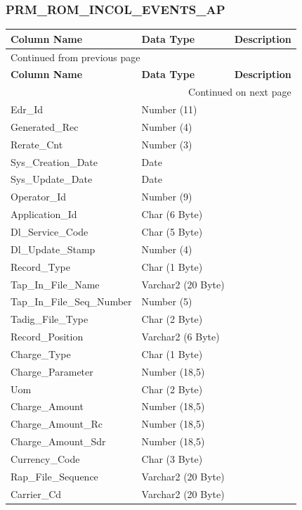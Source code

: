 \documentclass[12pt,twoside]{article}
\begin{document}
\subsubsection{PRM\_ROM\_INCOL\_EVENTS\_AP}
\label{sec:orgheadline84}
\footnotesize
\begin{longtable}{l|l|l}
\hline
\textbf{Column Name} & \textbf{Data Type} & \textbf{Description}\\
\hline
\endfirsthead
\multicolumn{3}{l}{Continued from previous page} \\
\hline

\textbf{Column Name} & \textbf{Data Type} & \textbf{Description} \\

\hline
\endhead
\hline\multicolumn{3}{r}{Continued on next page} \\
\endfoot
\endlastfoot
\hline
Edr\_Id & Number (11) & \\
Generated\_Rec & Number (4) & \\
Rerate\_Cnt & Number (3) & \\
Sys\_Creation\_Date & Date & \\
Sys\_Update\_Date & Date & \\
Operator\_Id & Number (9) & \\
Application\_Id & Char (6 Byte) & \\
Dl\_Service\_Code & Char (5 Byte) & \\
Dl\_Update\_Stamp & Number (4) & \\
Record\_Type & Char (1 Byte) & \\
Tap\_In\_File\_Name & Varchar2 (20 Byte) & \\
Tap\_In\_File\_Seq\_Number & Number (5) & \\
Tadig\_File\_Type & Char (2 Byte) & \\
Record\_Position & Varchar2 (6 Byte) & \\
Charge\_Type & Char (1 Byte) & \\
Charge\_Parameter & Number (18,5) & \\
Uom & Char (2 Byte) & \\
Charge\_Amount & Number (18,5) & \\
Charge\_Amount\_Rc & Number (18,5) & \\
Charge\_Amount\_Sdr & Number (18,5) & \\
Currency\_Code & Char (3 Byte) & \\
Rap\_File\_Sequence & Varchar2 (20 Byte) & \\
Carrier\_Cd & Varchar2 (20 Byte) & \\

\end{longtable}
\end{document}
